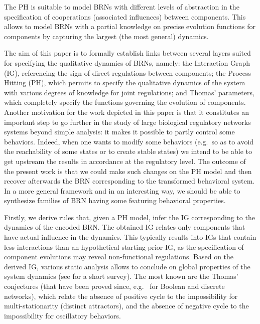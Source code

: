 The PH is suitable to model BRNs with different levels of abstraction in the specification of
cooperations (associated influences) between components.
This allows to model BRNs with a partial knowledge on precise evolution functions for components
by capturing the largest (the most general) dynamics.

\medskip

The aim of this paper is to formally establish links between several layers suited for specifying the
qualitative dynamics of BRNs, namely:
the Interaction Graph (IG), referencing the sign of direct regulations between components;
the Process Hitting (PH), which permits to specify the qualitative dynamics of the system with
various degrees of knowledge for joint regulations;
and Thomas' parameters, which completely specify the functions governing the evolution of
components.
Another motivation for the work depicted in this paper is that it constitutes an important step
to go further in the study of large biological regulatory networks systems beyond simple analysis:
it makes it possible to partly control some behaviors.
Indeed, when one wants to modify some behaviors
(e.g.~so as to avoid the reachability of some states or to create stable states)
we intend to be able to get upstream the results in accordance at the regulatory level.
The outcome of the present work is that we could make such changes on the PH model
and then recover afterwards the BRN corresponding to the transformed behavioral system.
In a more general framework and in an interesting way,
we should be able to synthesize families of BRN having some featuring behavioral properties.

Firstly, we derive rules that, given a PH model, infer the IG corresponding to the dynamics of the
encoded BRN.
The obtained IG relates only components that have actual influence in the dynamics.
This typically results into IGs that contain less interactions than an hypothetical starting prior
IG, as the specification of component evolutions may reveal non-functional regulations.
Based on the derived IG, various static analysis allows to conclude on global properties
of the system dynamics (see \cite{PR11-SASB} for a short survey).
The most known are the Thomas' conjectures (that have been proved since,
e.g.~\cite{RRT08,RiCo07,Richard2010378}
for Boolean and discrete networks),
which relate the absence of
positive cycle to the impossibility for multi-stationarity (distinct attractors),
and the absence of negative cycle to the impossibility for oscillatory behaviors.

